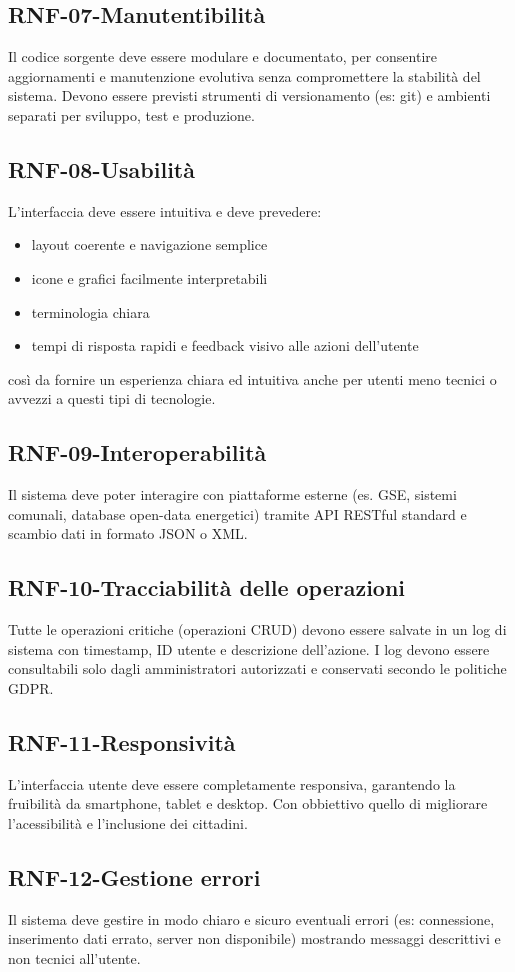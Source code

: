 \subsection*{RNF-07-Manutentibilità}
Il codice sorgente deve essere modulare e documentato,
per consentire aggiornamenti e manutenzione evolutiva
senza compromettere la stabilità del sistema.
Devono essere previsti strumenti di versionamento (es: git)
e ambienti separati per sviluppo, test e produzione.
\subsection*{RNF-08-Usabilità}
L'interfaccia deve essere intuitiva e deve prevedere:
\begin{itemize}
    \item layout coerente e navigazione semplice
    \item icone e grafici facilmente interpretabili
    \item terminologia chiara 
    \item tempi di risposta rapidi e feedback visivo alle azioni dell'utente
\end{itemize}
così da fornire un esperienza chiara ed intuitiva anche per utenti meno
tecnici o avvezzi a questi tipi di tecnologie.
\subsection*{RNF-09-Interoperabilità}
Il sistema deve poter interagire con piattaforme esterne
(es. GSE, sistemi comunali, database open-data energetici) tramite API RESTful
standard e scambio dati in formato JSON o XML.
\subsection*{RNF-10-Tracciabilità delle operazioni}
Tutte le operazioni critiche (operazioni CRUD)
devono essere salvate in un log di sistema con timestamp,
ID utente e descrizione dell’azione. I log devono essere consultabili solo dagli
amministratori autorizzati e conservati secondo le politiche GDPR.
\subsection*{RNF-11-Responsività}
L’interfaccia utente deve essere completamente responsiva,
garantendo la fruibilità da smartphone, tablet e desktop.
Con obbiettivo quello di migliorare l'acessibilità e l'inclusione
dei cittadini.
\subsection*{RNF-12-Gestione errori}
Il sistema deve gestire in modo chiaro e sicuro eventuali
errori (es: connessione, inserimento dati errato, server non
disponibile) mostrando messaggi descrittivi e non
tecnici all’utente.